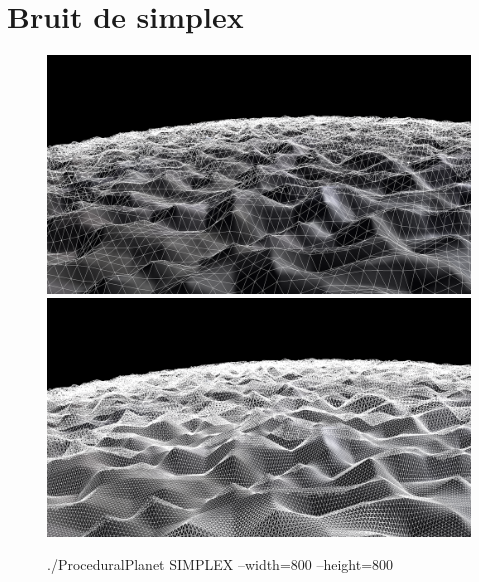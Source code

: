 \section{Bruit de simplex}

\begin{center}

\begin{figure}
    \centering
    \includegraphics[width=13cm]{img/SIMPLEX_w800_h800_wire_0.png}
    \includegraphics[width=13cm]{img/SIMPLEX_w800_h800_wire_1.png}
    \caption{./ProceduralPlanet SIMPLEX --width=800 --height=800}
    \label{fig:simplex_800}
\end{figure}



\end{center}
